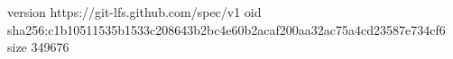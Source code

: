 version https://git-lfs.github.com/spec/v1
oid sha256:c1b10511535b1533c208643b2bc4e60b2acaf200aa32ac75a4cd23587e734cf6
size 349676
